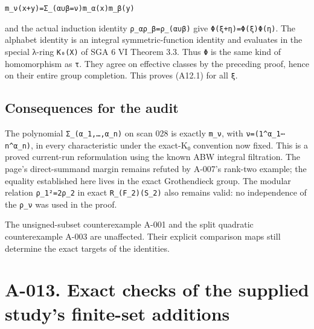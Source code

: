 \documentclass[
  10pt,
]{article}
\begin{document}
\texttt{\small m\_\allowbreak{}ν(\allowbreak{}x+\allowbreak{}y)\allowbreak{}=\allowbreak{}Σ\_\allowbreak{}(\allowbreak{}α∪β=\allowbreak{}ν)\allowbreak{}m\_\allowbreak{}α(\allowbreak{}x)\allowbreak{}m\_\allowbreak{}β(\allowbreak{}y)\allowbreak{}}

and the actual induction identity
\texttt{\small ρ\_\allowbreak{}αρ\_\allowbreak{}β=\allowbreak{}ρ\_\allowbreak{}(\allowbreak{}α∪β)\allowbreak{}}
give
\texttt{\small Φ(\allowbreak{}ξ+\allowbreak{}η)\allowbreak{}=\allowbreak{}Φ(\allowbreak{}ξ)\allowbreak{}Φ(\allowbreak{}η)\allowbreak{}}.
The alphabet identity is an integral symmetric-function identity and
evaluates in the special λ-ring
\texttt{\small K₀(\allowbreak{}X)\allowbreak{}} of SGA 6 VI Theorem 3.3.
Thus \texttt{\small Φ} is the same kind of homomorphism as
\texttt{\small τ}. They agree on effective classes by the preceding
proof, hence on their entire group completion. This proves (A12.1) for
all \texttt{\small ξ}.

\subsection{Consequences for the
audit}\label{consequences-for-the-audit}

The polynomial
\texttt{\small Σ\_\allowbreak{}(\allowbreak{}α\_\allowbreak{}1,\allowbreak{}…,\allowbreak{}α\_\allowbreak{}n)\allowbreak{}}
on scan 028 is exactly \texttt{\small m\_\allowbreak{}ν}, with
\texttt{\small ν=\allowbreak{}(\allowbreak{}1\textasciicircum{}α\_\allowbreak{}1⋯n\textasciicircum{}α\_\allowbreak{}n)\allowbreak{}},
in every characteristic under the exact-K₀ convention now fixed. This is
a proved current-run reformulation using the known ABW integral
filtration. The page's direct-summand margin remains refuted by A-007's
rank-two example; the equality established here lives in the exact
Grothendieck group. The modular relation
\texttt{\small ρ\_\allowbreak{}1²=\allowbreak{}2ρ\_\allowbreak{}2} in
exact
\texttt{\small R\_\allowbreak{}(\allowbreak{}F\_\allowbreak{}2)\allowbreak{}(\allowbreak{}S\_\allowbreak{}2)\allowbreak{}}
also remains valid: no independence of the
\texttt{\small ρ\_\allowbreak{}ν} was used in the proof.

The unsigned-subset counterexample A-001 and the split quadratic
counterexample A-003 are unaffected. Their explicit comparison maps
still determine the exact targets of the identities.

\section{A-013. Exact checks of the supplied study's finite-set
additions}\label{a-013.-exact-checks-of-the-supplied-studys-finite-set-additions}
\end{document}
